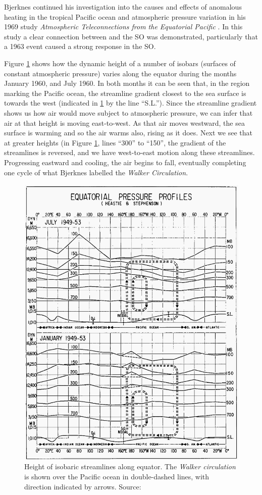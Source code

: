 Bjerknes continued his investigation into the causes and effects of anomalous
heating in the tropical Pacific ocean and atmospheric pressure variation in his
1969 study \emph{Atmospheric Teleconnections from the Equatorial Pacific}
\citet{bjerknes1969}. In this study a clear connection between \elnino{} and the
SO was demonstrated, particularly that a 1963 \elnino{} event caused a strong
response in the SO.

Figure \ref{fig:pressureprofiles} shows how the dynamic height of a number of
isobars (surfaces of constant atmospheric pressure) varies along the equator
during the months January 1960, and July 1960. In both months it can be seen
that, in the region marking the Pacific ocean, the streamline gradient closest
to the sea surface is towards the west (indicated in \ref{fig:pressureprofiles}
by the line ``S.L.''). Since the streamline gradient shows us how air would move
subject to atmospheric pressure, we can infer that air at that height is moving
east-to-west. As that air moves westward, the sea surface is warming and so the
air warms also, rising as it does. Next we see that at greater heights (in
Figure \ref{fig:pressureprofiles}, lines ``300'' to ``150'', the gradient of the
streamlines is reversed, and we have west-to-east motion along these
streamlines. Progressing eastward and cooling, the air begins to fall,
eventually completing one cycle of what Bjerknes labelled the \emph{Walker
  Circulation}.

\begin{figure}[t]
  \centering
  \includegraphics[width=0.9\linewidth]{figures/equatorial-pressure-profiles.png}
  \caption{Height of isobaric streamlines along equator. The \emph{Walker
      circulation} is shown over the Pacific ocean in double-dashed lines, with
    direction indicated by arrows. Source: \citet{bjerknes1969}}
  \label{fig:pressureprofiles}
\end{figure}

